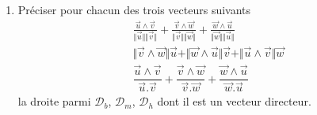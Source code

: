 \begin{enumerate}
\begin{enumerate}
\end{enumerate} 

\item Préciser pour chacun des trois vecteurs suivants
\begin{eqnarray*}
\frac{\overrightarrow{u}\wedge \overrightarrow{v}}{\Vert \overrightarrow{u}\Vert \Vert \overrightarrow{v} \Vert} +
\frac{\overrightarrow{v}\wedge \overrightarrow{w}}{\Vert \overrightarrow{v}\Vert \Vert \overrightarrow{w} \Vert} +
\frac{\overrightarrow{w}\wedge \overrightarrow{u}}{\Vert \overrightarrow{w}\Vert \Vert \overrightarrow{u} \Vert} \\
\Vert \overrightarrow{v}\wedge \overrightarrow{w} \Vert \overrightarrow{u} +
\Vert \overrightarrow{w}\wedge \overrightarrow{u} \Vert \overrightarrow{v} +
\Vert \overrightarrow{u}\wedge \overrightarrow{v} \Vert \overrightarrow{w} \\
\dfrac{\overrightarrow{u}\wedge \overrightarrow{v}}{\overrightarrow{u}. \overrightarrow{v}} +
\dfrac{\overrightarrow{v}\wedge \overrightarrow{w}}{\overrightarrow{v}. \overrightarrow{w}} +
\dfrac{\overrightarrow{w}\wedge \overrightarrow{u}}{\overrightarrow{w}. \overrightarrow{u}}
\end{eqnarray*}
la droite parmi $\mathcal{D}_b$, $\mathcal{D}_m$, $\mathcal{D}_h$ dont il est un vecteur directeur.
\end{enumerate}
\clearpage